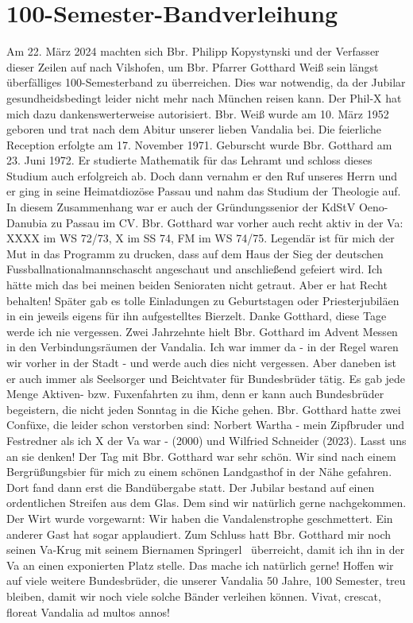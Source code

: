 \section{100-Semester-Bandverleihung}

\begin{multicols}{2}
Am 22. März 2024 machten sich Bbr. Philipp Kopystynski und der Verfasser
dieser Zeilen auf nach Vilshofen, um Bbr. Pfarrer Gotthard Weiß sein
längst überfälliges 100-Semesterband zu überreichen. Dies war notwendig,
da der Jubilar gesundheidsbedingt leider nicht mehr nach München reisen
kann. Der Phil-X hat mich dazu dankenswerterweise autorisiert.
Bbr. Weiß wurde am 10. März 1952 geboren und trat nach dem Abitur
unserer lieben Vandalia bei. Die feierliche Reception erfolgte am 17.
November 1971. Geburscht wurde Bbr. Gotthard am 23. Juni 1972. Er
studierte Mathematik für das Lehramt und schloss dieses Studium auch
erfolgreich ab. Doch dann vernahm er den Ruf unseres Herrn und er ging
in seine Heimatdiozöse Passau und nahm das Studium der Theologie auf. In
diesem Zusammenhang war er auch der Gründungssenior der KdStV
Oeno-Danubia zu Passau im CV.
Bbr. Gotthard war vorher auch recht aktiv in der Va: XXXX im WS 72/73, X
im SS 74, FM im WS 74/75. Legendär ist für mich der Mut in das Programm
zu drucken, dass auf dem Haus der Sieg der deutschen
Fussballnationalmannschascht angeschaut und anschließend gefeiert wird.
Ich hätte mich das bei meinen beiden Senioraten nicht getraut. Aber er
hat Recht behalten!
Später gab es tolle Einladungen zu Geburtstagen oder Priesterjubiläen
in  ein jeweils eigens für ihn aufgestelltes Bierzelt. Danke Gotthard,
diese Tage werde ich nie vergessen.
Zwei Jahrzehnte hielt Bbr. Gotthard im Advent Messen in den
Verbindungsräumen der Vandalia. Ich war immer da - in der Regel waren
wir vorher in der Stadt - und werde auch dies nicht vergessen. Aber
daneben ist er auch immer als Seelsorger und Beichtvater für
Bundesbrüder tätig. Es gab jede Menge Aktiven- bzw. Fuxenfahrten zu ihm,
denn er kann auch Bundesbrüder begeistern, die nicht jeden Sonntag in
die Kiche gehen.
Bbr. Gotthard hatte zwei Confüxe, die leider schon verstorben sind:
Norbert Wartha - mein Zipfbruder und Festredner als ich X der Va war -
(2000) und Wilfried Schneider (2023). Lasst uns an sie denken!
Der Tag mit Bbr. Gotthard war sehr schön. Wir sind nach einem
Bergrüßungsbier für mich zu einem schönen Landgasthof in der Nähe
gefahren. Dort fand dann erst die Bandübergabe statt. Der Jubilar
bestand auf einen ordentlichen Streifen aus dem Glas. Dem sind wir
natürlich gerne nachgekommen. Der Wirt wurde vorgewarnt: Wir haben die
Vandalenstrophe geschmettert. Ein anderer Gast hat sogar applaudiert.
Zum Schluss hatt Bbr. Gotthard mir noch seinen Va-Krug mit seinem
Biernamen \glqq Springerl\grqq ~ überreicht, damit ich ihn in der Va an einen
exponierten Platz stelle. Das mache ich natürlich gerne!
Hoffen wir auf viele weitere Bundesbrüder, die unserer Vandalia 50
Jahre, 100 Semester, treu bleiben, damit wir noch viele solche Bänder
verleihen können.
Vivat, crescat, floreat Vandalia ad multos annos!


\end{multicols}
